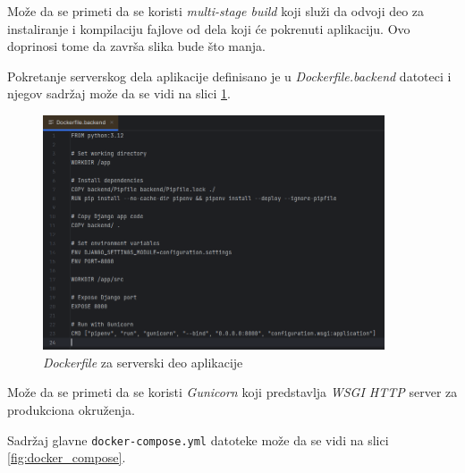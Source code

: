 \documentclass[12pt,oneside]{memoir}
\begin{document}
Može da se primeti da se koristi \emph{multi-stage build} koji služi da odvoji deo za instaliranje i kompilaciju fajlove od dela koji će pokrenuti aplikaciju. Ovo doprinosi tome da završa slika bude što manja.

Pokretanje serverskog dela aplikacije definisano je u \emph{Dockerfile.backend} datoteci i njegov sadržaj može da se vidi na slici \ref{fig:docker_backend}.

\begin{figure}[h]
\centering
\includegraphics[width=0.9\textwidth]{images/docker_backend.png}
\caption{\emph{Dockerfile} za serverski deo aplikacije}
\label{fig:docker_backend}
\end{figure}

Može da se primeti da se koristi \emph{Gunicorn} koji predstavlja \emph{WSGI HTTP} server za produkciona okruženja.

Sadržaj glavne \texttt{docker-compose.yml} datoteke može da se vidi na slici \ref{fig:docker_compose}.
\end{document}
